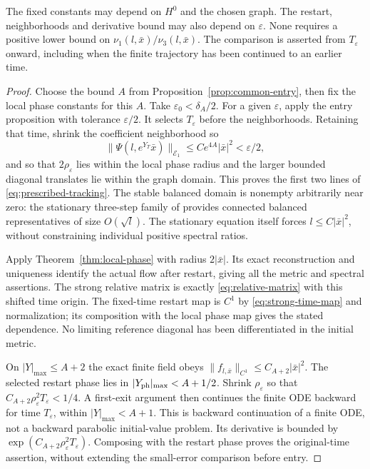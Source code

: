 \documentclass[11pt]{amsart}
\theoremstyle{definition}
\theoremstyle{remark}
\begin{document}
The fixed constants may depend on $H^0$ and the chosen graph.
The restart, neighborhoods and derivative bound may also depend
on $\varepsilon$. None requires a positive lower bound on
$\nu_1(l,\bar x)/\nu_3(l,\bar x)$. The comparison is asserted
from $T_\varepsilon$ onward, including when the finite trajectory
has been continued to an earlier time.

\begin{proof}
Choose the bound $A$ from Proposition~\ref{prop:common-entry},
then fix the local phase constants for this $A$.
Take $\varepsilon_0<\delta_A/2$. For a given $\varepsilon$,
apply the entry proposition with tolerance $\varepsilon/2$.
It selects $T_\varepsilon$ before the neighborhoods.
Retaining that time, shrink the coefficient neighborhood so
\[
 \|\Psi(l,e^{Y_T}\bar x)\|_{\mathcal E_1}
       \le Ce^{4A}|\bar x|^2<\varepsilon/2,
\]
and so that $2\rho_\varepsilon$ lies within the local phase
radius and the larger bounded diagonal translates lie within
the graph domain. This proves the first two lines of
\eqref{eq:prescribed-tracking}.
The stable balanced domain is nonempty arbitrarily near zero:
the stationary three-step family of \cite{WuebbenThreeStep26}
provides connected balanced representatives of size $O(\sqrt l)$.
The stationary equation itself forces $l\le C|\bar x|^2$,
without constraining individual positive spectral ratios.

Apply Theorem~\ref{thm:local-phase} with radius $2|\bar x|$.
Its exact reconstruction and uniqueness identify the actual
flow after restart, giving all the metric and spectral assertions.
The strong relative matrix is exactly
\eqref{eq:relative-matrix} with this shifted time origin.
The fixed-time restart map is $C^1$ by
\eqref{eq:strong-time-map} and normalization; its composition
with the local phase map gives the stated dependence.
No limiting reference diagonal has been differentiated in the
initial metric.

On $|Y|_{\max}\le A+2$ the exact finite field obeys
$\|f_{l,\bar x}\|_{C^1}\le C_{A+2}|\bar x|^2$.
The selected restart phase lies in $|Y_{\rm ph}|_{\max}<A+1/2$.
Shrink $\rho_\varepsilon$ so that
$C_{A+2}\rho_\varepsilon^2T_\varepsilon<1/4$.
A first-exit argument then continues the finite ODE backward
for time $T_\varepsilon$, within $|Y|_{\max}<A+1$.
This is backward continuation of a finite ODE, not a backward
parabolic initial-value problem. Its derivative is bounded by
$\exp(C_{A+2}\rho_\varepsilon^2T_\varepsilon)$.
Composing with the restart phase proves the original-time
assertion, without extending the small-error comparison before
entry.
\end{proof}
\end{document}
